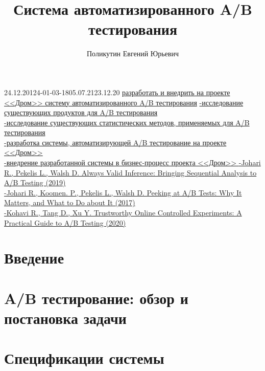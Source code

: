 \documentclass{fefu}
\author{Поликутин Евгений Юрьевич}
\title{Система автоматизированного A/B тестирования}
\begin{document}
    \makethesistitlebackside
    \begin{thesistask}{24.12.20}{124-01-03-18}{05.07.21}{23.12.20}
    	\taskitem \uline{разработать и внедрить на проекте <<Дром>> систему автоматизированного A/B тестирования}
    	\taskitem \uline{
    		-исследование существующих продуктов для A/B тестирования\\
    		-исследование существующих статистических методов, применяемых для A/B тестирования\\
    		-разработка системы, автоматизирующей A/B тестирование на проекте <<Дром>>\\
    		-внедрение разработанной системы в бизнес-процесс проекта <<Дром>>
    	}
    	\taskitem \uline{
    		-Johari R., Pekelis L., Walsh D. Always Valid Inference: Bringing Sequential Analysis to A/B Testing (2019)\\
    		-Johari R., Koomen. P., Pekelis L., Walsh D. Peeking at A/B Tests: Why It Matters, and What to Do about It (2017)\\
    		-Kohavi R., Tang D., Xu Y. Trustworthy Online Controlled Experiments: A Practical Guide to A/B Testing (2020)
    	}
    \end{thesistask}
    \begin{abstract}
    	
    \end{abstract}
    \tableofcontents
    \section*{Введение}
    
    \newpage
    \printglossary[type=main,title={Глоссарий}]
    \newpage
    \section{A/B тестирование: обзор и постановка задачи}
    
    \newpage
    \section{Спецификации системы}
    
    \newpage
\end{document}
